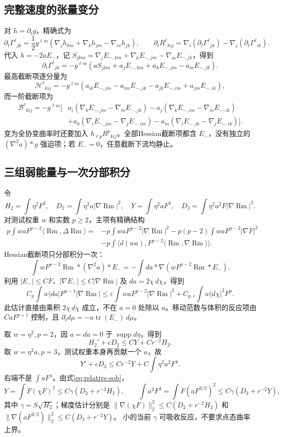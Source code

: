 \documentclass[UTF8,a4paper,11pt,fontset=fandol]{ctexart}
\numberwithin{equation}{section}
\theoremstyle{definition}
\newcommand{\Rm}{\operatorname{Rm}}
\newcommand{\tr}{\operatorname{tr}}
\begin{document}
\subsection{完整速度的张量变分}
对 $h=\partial_tg$，精确式为
\[
\partial_t\Gamma^\ell{}_{jk}
=\frac12g^{\ell m}(\nabla_jh_{km}+\nabla_kh_{jm}-\nabla_mh_{jk}),
\qquad
\partial_tR^\ell{}_{kij}
=\nabla_i(\partial_t\Gamma^\ell{}_{jk})
-\nabla_j(\partial_t\Gamma^\ell{}_{ik}).
\]
代入 $h=-2aE_-$，记 $S_{jkm}=\nabla_jE_{-,km}+\nabla_kE_{-,jm}-\nabla_mE_{-,jk}$，得到
\[
\partial_t\Gamma^\ell{}_{jk}
=-g^{\ell m}(aS_{jkm}+a_jE_{-,km}+a_kE_{-,jm}-a_mE_{-,jk}).
\]
最高截断项逐分量为
\[
\mathcal H^\ell{}_{kij}
=-g^{\ell m}(a_{ik}E_{-,jm}-a_{im}E_{-,jk}
-a_{jk}E_{-,im}+a_{jm}E_{-,ik}),
\]
而一阶截断项为
\begin{align*}
\mathcal B^\ell{}_{kij}=-g^{\ell m}\bigl[
&a_i(\nabla_kE_{-,jm}-\nabla_mE_{-,jk})
-a_j(\nabla_kE_{-,im}-\nabla_mE_{-,ik})\\
&+a_k(\nabla_iE_{-,jm}-\nabla_jE_{-,im})
-a_m(\nabla_iE_{-,jk}-\nabla_jE_{-,ik})\bigr].
\end{align*}
变为全协变曲率时还要加入 $h_{\ell p}R^p{}_{kij}$。全部Hessian截断项都含 $E_-$，没有独立的 $(\nabla^2a)*g$ 强迫项；若 $E_-=0$，任意截断下流均静止。

\subsection{三组弱能量与一次分部积分}
令
\[
H_2=\int\eta^2F^2,\quad D_2=\int\eta^2a|\nabla\Rm|^2,\quad
Y=\int\eta^2aF^3,\quad D_3=\int\eta^2a^2F|\nabla\Rm|^2.
\]
对测试权重 $w$ 和实数 $p\ge2$，主项有精确结构
\begin{align*}
p\int waF^{p-2}\langle\Rm,\Delta\Rm\rangle
={}&-p\int waF^{p-2}|\nabla\Rm|^2
-p(p-2)\int waF^{p-2}|\nabla F|^2\\
&-p\int\langle d(wa),F^{p-2}\langle\Rm,\nabla\Rm\rangle\rangle.
\end{align*}
Hessian截断项只分部积分一次：
\[
\int wF^{p-2}\Rm*(\nabla^2a)*E_-
=-\int da*\nabla(wF^{p-2}\Rm*E_-).
\]
利用 $|E_-|\le CF$、$|\nabla E_-|\le C|\nabla\Rm|$ 及
$da=2\chi\,d\chi$，得到
\[
C_p\int w|da|F^{p-1}|\nabla\Rm|
\le\varepsilon\int waF^{p-2}|\nabla\Rm|^2
+C_{p,\varepsilon}\int w|d\chi|^2F^p.
\]
此估计直接由乘积 $2\chi\,d\chi$ 成立，不在 $a=0$ 处除以 $a$。移动范数与体积的反应项由 $CaF^{p+1}$ 控制，且
$\partial_t d\mu=-a\tr(E_-)\,d\mu$。

取 $w=\eta^2,p=2$，因 $a=da=0$ 于 $\operatorname{supp}d\eta$，得到
\begin{equation}\label{eq:H2energy}
H_2'+cD_2\le CY+Cr^{-2}H_2.
\end{equation}
取 $w=\eta^2a,p=3$，测试权重本身再贡献一个 $a$，故
\begin{equation}\label{eq:H3energy}
Y'+cD_3\le Cr^{-2}Y+C\int\eta^2a^2F^4.
\end{equation}
右端不是 $\int aF^4$。由式\eqref{eq:relative-sob}，
\[
Y=\int F(\chi F)^2
\le C\gamma(D_2+r^{-2}H_2),\qquad
\int a^2F^4=\int F(aF^{3/2})^2
\le C\gamma(D_3+r^{-2}Y),
\]
其中 $\gamma=S\sqrt{H_2}$；梯度估计分别是
$\|\nabla(\chi F)\|_2^2\le C(D_2+r^{-2}H_2)$ 和
$\|\nabla(aF^{3/2})\|_2^2\le C(D_3+r^{-2}Y)$。
小的当前 $\gamma$ 可吸收反应，不要求点态曲率上界。
\end{document}
